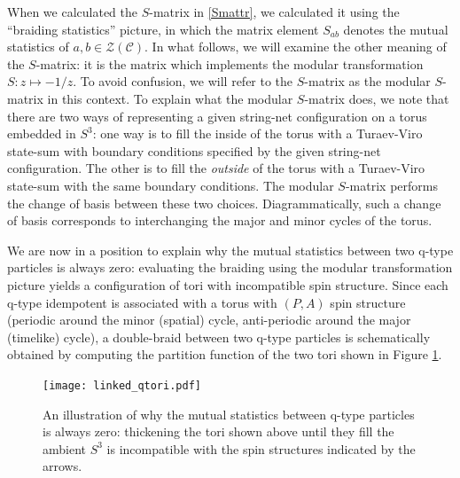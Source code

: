 \documentclass[12pt,a4paper]{article}
\newcounter{arrow}
\newcommand{\mcz}{\mathcal{Z}}
\newcommand{\mcc}{\mathcal{C}}
\begin{document}

When we calculated the $S$-matrix in \eqref{Smattr}, we calculated it using the ``braiding statistics'' picture, in which the matrix element $S_{ab}$ denotes the mutual statistics of $a,b\in \mcz(\mcc)$. In what follows, we will examine the other meaning of the $S$-matrix: it is the matrix which implements the modular transformation $S : z \mapsto -1/z$. To avoid confusion, we will refer to the $S$-matrix as the modular $S$-matrix in this context. To explain what the modular $S$-matrix does, we note that there are two ways of representing a given string-net configuration on a torus embedded in $S^3$: one way is to fill the inside of the torus with a Turaev-Viro state-sum with boundary conditions specified by the given string-net configuration. The other is to fill the {\it outside} of the torus with a Turaev-Viro state-sum with the same boundary conditions. The modular $S$-matrix performs the change of basis between these two choices. Diagrammatically, such a change of basis corresponds to interchanging the major and minor cycles of the torus. 

We are now in a position to explain why the mutual statistics between two q-type particles is always zero: evaluating the braiding using the modular transformation picture yields a configuration of tori with incompatible spin structure. Since each q-type idempotent is associated with a torus with $(P,A)$ spin structure (periodic around the minor (spatial) cycle, anti-periodic around the major (timelike) cycle), a double-braid between two q-type particles is schematically obtained by computing the partition function of the two tori shown in Figure \ref{linked_tori}. 
\begin{figure} 
\centering
\texttt{[image: linked\_qtori.pdf]}
\caption{\label{linked_tori} An illustration of why the mutual statistics between q-type particles is always zero: thickening the tori shown above until they fill the ambient $S^3$ is incompatible with the spin structures indicated by the arrows.}
\end{figure}
\end{document}
